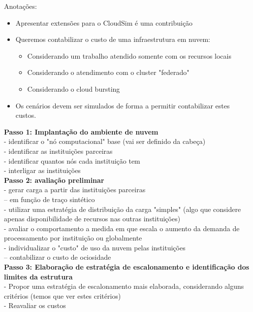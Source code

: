 \documentclass[tese,capa]{texufpel}
\begin{document}
Anotações:
  \begin{itemize}
      \item Apresentar extensões para o CloudSim é uma contribuição
      \item Queremos contabilizar o custo de uma infraestrutura em nuvem:
        \begin{itemize}
            \item Considerando um trabalho atendido somente com os recursos locais
            \item Considerando o atendimento com o cluster "federado"
            \item Considerando o cloud bursting
        \end{itemize}
        \item Os cenários devem ser simulados de forma a permitir contabilizar estes custos.
  \end{itemize}

\textbf{Passo 1: Implantação do ambiente de nuvem}\\
- identificar o "nó computacional" base (vai ser definido da cabeça)\\
- identificar as instituições parceiras\\
- identificar quantos nós cada instituição tem\\
- interligar as instituições\\

\textbf{Passo 2: avaliação preliminar}\\
- gerar carga a partir das instituições parceiras\\
-- em função de traço sintético\\
- utilizar uma estratégia de distribuição da carga "simples" (algo que considere apenas disponibilidade de recursos nas outras instituições)\\
- avaliar o comportamento a medida em que escala o aumento da demanda de processamento por instituição ou globalmente\\
- individualizar o "custo" de uso da nuvem pelas instituições\\
-- contabilizar o custo de ociosidade\\

\textbf{Passo 3: Elaboração de estratégia de escalonamento e identificação dos limites da estrutura}\\
- Propor uma estratégia de escalonamento mais elaborada, considerando alguns critérios (temos que ver estes critérios)\\
- Reavaliar os custos\\
\end{document}
